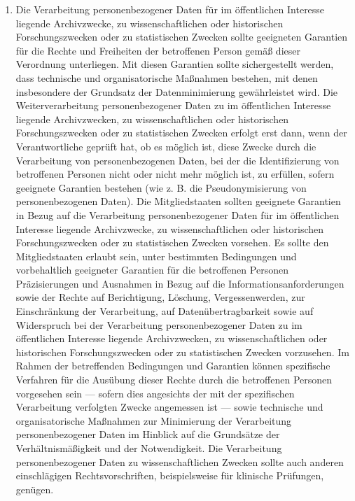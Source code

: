 \begin{enumerate}
   \item Die Verarbeitung personenbezogener Daten für im öffentlichen Interesse liegende Archivzwecke, zu
    wissenschaftlichen oder historischen Forschungszwecken oder zu statistischen Zwecken sollte geeigneten Garantien
    für die Rechte und Freiheiten der betroffenen Person gemäß dieser Verordnung unterliegen. Mit diesen Garantien
    sollte sichergestellt werden, dass technische und organisatorische Maßnahmen bestehen, mit denen insbesondere der
    Grundsatz der Datenminimierung gewährleistet wird. Die Weiterverarbeitung personenbezogener Daten zu im
    öffentlichen Interesse liegende Archivzwecken, zu wissenschaftlichen oder historischen Forschungszwecken oder zu
    statistischen Zwecken erfolgt erst dann, wenn der Verantwortliche geprüft hat, ob es möglich ist, diese Zwecke
    durch die Verarbeitung von personenbezogenen Daten, bei der die Identifizierung von betroffenen Personen nicht oder
    nicht mehr möglich ist, zu erfüllen, sofern geeignete Garantien bestehen (wie z. B. die Pseudonymisierung von
    personenbezogenen Daten). Die Mitgliedstaaten sollten geeignete Garantien in Bezug auf die Verarbeitung
    personenbezogener Daten für im öffentlichen Interesse liegende Archivzwecke, zu wissenschaftlichen oder
    historischen Forschungszwecken oder zu statistischen Zwecken vorsehen. Es sollte den Mitgliedstaaten erlaubt sein,
    unter bestimmten Bedingungen und vorbehaltlich geeigneter Garantien für die betroffenen Personen Präzisierungen und
    Ausnahmen in Bezug auf die Informationsanforderungen sowie der Rechte auf Berichtigung, Löschung, Vergessenwerden,
    zur Einschränkung der Verarbeitung, auf Datenübertragbarkeit sowie auf Widerspruch bei der Verarbeitung
    personenbezogener Daten zu im öffentlichen Interesse liegende Archivzwecken, zu wissenschaftlichen oder
    historischen Forschungszwecken oder zu statistischen Zwecken vorzusehen. Im Rahmen der betreffenden Bedingungen und
    Garantien können spezifische Verfahren für die Ausübung dieser Rechte durch die betroffenen Personen vorgesehen
    sein — sofern dies angesichts der mit der spezifischen Verarbeitung verfolgten Zwecke angemessen ist — sowie
    technische und organisatorische Maßnahmen zur Minimierung der Verarbeitung personenbezogener Daten im Hinblick auf
    die Grundsätze der Verhältnismäßigkeit und der Notwendigkeit. Die Verarbeitung personenbezogener Daten zu
    wissenschaftlichen Zwecken sollte auch anderen einschlägigen Rechtsvorschriften, beispielsweise für klinische
    Prüfungen, genügen.%
   \label{eg:156}
   

\end{enumerate}
